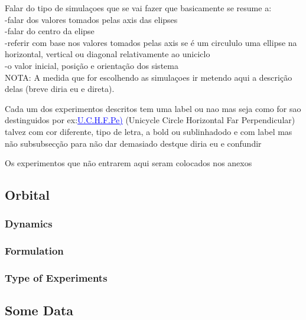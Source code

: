 Falar do tipo de simulaçoes que se vai fazer que basicamente se resume a:\\
-falar dos valores tomados pelas axis das elipses\\
-falar do centro da elipse\\
-referir com base nos valores tomados pelas axis se é um circululo uma ellipse na horizontal, vertical ou diagonal relativamente ao uniciclo\\
-o valor inicial, posição e orientação dos sistema\\

NOTA: A medida que for escolhendo as simulaçoes ir metendo aqui a descrição delas (breve diria eu e direta).\par
Cada um dos experimentos descritos tem uma label ou nao mas seja como for sao destinguidos por ex:\textcolor{blue}{\underline{U.C.H.F.Pe)}} (Unicycle Circle Horizontal Far Perpendicular) talvez com cor diferente, tipo de letra, a bold ou sublinhadodo e com label mas não subsubsecção para não dar demasiado destque diria eu e confundir


Os experimentos que não entrarem aqui seram colocados nos anexos



\subsection{Orbital}
\label{subsec:orbital_simul_setup}

\subsubsection{Dynamics}
\label{subsubsec:orbital_dynamics}



\subsubsection{ Formulation}
\label{subsubsec:Orbital_CLF-CBF_Experiment_Setup}


\subsubsection{Type of Experiments}
\label{subsubsec:orbital_type_of_experiments}



\subsection{Some Data}
\label{subsec:some_data}

